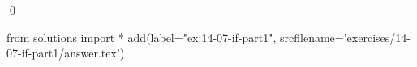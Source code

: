 
\begin{ex}
  \label{ex:14-07-if-part1}
  
  \qed
\end{ex}
\begin{python0}
from solutions import *
add(label="ex:14-07-if-part1",
    srcfilename='exercises/14-07-if-part1/answer.tex')
\end{python0}
